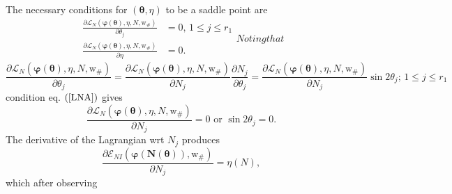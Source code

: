 \documentclass[aps,preprint]{revtex4}%
\begin{document}
The necessary conditions for $\left(  \mathbf{\theta},\eta\right)  $ to be a
saddle point are
\begin{subequations}
\begin{align}
\frac{\partial\mathcal{L}_{N}\left(  \mathbf{\varphi}\left(  \mathbf{\theta
}\right)  ,\eta\mathbf{,}N\mathbf{,}\mathrm{w}_{\#}\right)  }{\partial
\theta_{j}}  &  =0,\,1\leq j\leq r_{1}\label{LNA}\\
\frac{\partial\mathcal{L}_{N}\left(  \mathbf{\varphi}\left(  \mathbf{\theta
}\right)  ,\eta\mathbf{,}N\mathbf{,}\mathrm{w}_{\#}\right)  }{\partial\eta}
&  =0. \label{LNB}%
\end{align}
Noting that
\end{subequations}
\begin{equation}
\frac{\partial\mathcal{L}_{N}\left(  \mathbf{\varphi}\left(  \mathbf{\theta
}\right)  ,\eta\mathbf{,}N\mathbf{,}\mathrm{w}_{\#}\right)  }{\partial
\theta_{j}}=\frac{\partial\mathcal{L}_{N}\left(  \mathbf{\varphi}\left(
\mathbf{\theta}\right)  ,\eta\mathbf{,}N\mathbf{,}\mathrm{w}_{\#}\right)
}{\partial N_{j}}\frac{\partial N_{j}}{\partial\theta_{j}}=\frac
{\partial\mathcal{L}_{N}\left(  \mathbf{\varphi}\left(  \mathbf{\theta
}\right)  ,\eta\mathbf{,}N\mathbf{,}\mathrm{w}_{\#}\right)  }{\partial N_{j}%
}\sin2\theta_{j};\,1\leq j\leq r_{1}%
\end{equation}
condition eq. $\left(  \ref{LNA}\right)  $ gives
\begin{equation}
\frac{\partial\mathcal{L}_{N}\left(  \mathbf{\varphi}\left(  \mathbf{\theta
}\right)  ,\eta\mathbf{,}N\mathbf{,}\mathrm{w}_{\#}\right)  }{\partial N_{j}%
}=0\text{ or }\sin2\theta_{j}=0.
\end{equation}
The derivative of the Lagrangian wrt $N_{j}$ produces%
\begin{equation}
\frac{\partial\mathcal{E}_{NI}\left(  \mathbf{\varphi}\left(  \mathbf{N}%
\left(  \mathbf{\theta}\right)  \right)  \mathbf{,}\mathrm{w}_{\#}\right)
}{\partial N_{j}}=\eta\left(  N\right)  ,
\end{equation}
which after observing
\end{document}
